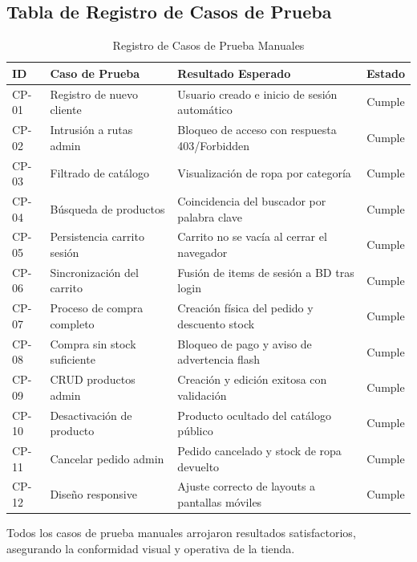 \subsection{Tabla de Registro de Casos de Prueba}
\begin{table}[h!]
\centering
\caption{Registro de Casos de Prueba Manuales}
\label{tab:pruebas_manuales}
\begin{tabular}{lp{5cm}p{4cm}c}
\toprule
\textbf{ID} & \textbf{Caso de Prueba} & \textbf{Resultado Esperado} & \textbf{Estado} \\
\midrule
CP-01 & Registro de nuevo cliente & Usuario creado e inicio de sesión automático & Cumple \\
CP-02 & Intrusión a rutas admin & Bloqueo de acceso con respuesta 403/Forbidden & Cumple \\
CP-03 & Filtrado de catálogo & Visualización de ropa por categoría & Cumple \\
CP-04 & Búsqueda de productos & Coincidencia del buscador por palabra clave & Cumple \\
CP-05 & Persistencia carrito sesión & Carrito no se vacía al cerrar el navegador & Cumple \\
CP-06 & Sincronización del carrito & Fusión de items de sesión a BD tras login & Cumple \\
CP-07 & Proceso de compra completo & Creación física del pedido y descuento stock & Cumple \\
CP-08 & Compra sin stock suficiente & Bloqueo de pago y aviso de advertencia flash & Cumple \\
CP-09 & CRUD productos admin & Creación y edición exitosa con validación & Cumple \\
CP-10 & Desactivación de producto & Producto ocultado del catálogo público & Cumple \\
CP-11 & Cancelar pedido admin & Pedido cancelado y stock de ropa devuelto & Cumple \\
CP-12 & Diseño responsive & Ajuste correcto de layouts a pantallas móviles & Cumple \\
\bottomrule
\end{tabular}
\end{table}

Todos los casos de prueba manuales arrojaron resultados satisfactorios, asegurando la conformidad visual y operativa de la tienda.
